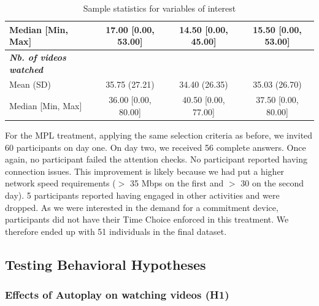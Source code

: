 \documentclass[11pt,a4paper,oneside]{article}
\begin{document}
\begin{table}[]
{\begin{tabular}{@{}lccc@{}}
Median {[}Min, Max{]} & 17.00 {[}0.00, 53.00{]}    & 14.50 {[}0.00, 45.00{]}    & 15.50 {[}0.00, 53.00{]}    \\\hline
\textbf{\textit{Nb. of videos watched}} &                            &                            &                            \\
Mean (SD)             & 35.75 (27.21)              & 34.40 (26.35)              & 35.03 (26.70)              \\
Median {[}Min, Max{]} & 36.00 {[}0.00, 80.00{]}    & 40.50 {[}0.00, 77.00{]}    & 37.50 {[}0.00, 80.00{]}    \\
\bottomrule
\end{tabular}%
}
\caption{Sample statistics for variables of interest}
\label{table3}
\end{table}


For the MPL treatment, applying the same selection criteria as before, we invited 60 participants on day one. On day two, we received 56 complete answers. Once again, no participant failed the attention checks. No participant reported having connection issues. This improvement is likely because we had put a higher network speed requirements ($>$ 35 Mbps on the first and $>$ 30 on the second day). 5 participants reported having engaged in other activities and were dropped. As we were interested in the demand for a commitment device, participants did not have their Time Choice enforced in this treatment. We therefore ended up with 51 individuals in the final dataset.

\subsection{Testing Behavioral Hypotheses}
 
\subsubsection{Effects of Autoplay on watching videos (H1)}
\end{document}
